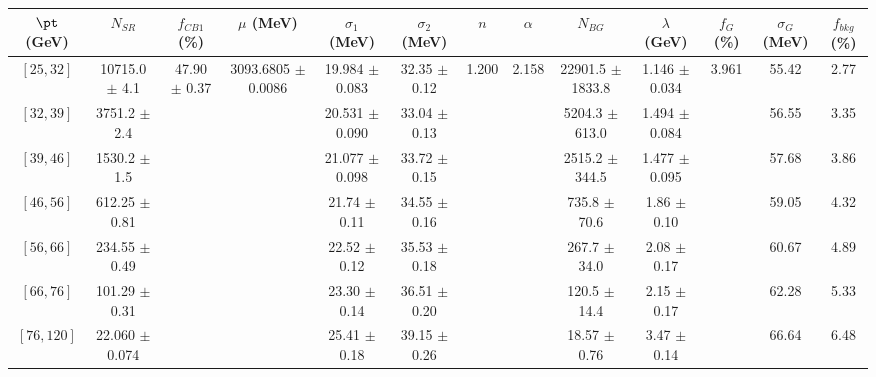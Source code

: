 \begin{tabular}{c||c|c|c|c|c|c|c|c|c|c|c||c}
$\pt$ (GeV) & $N_{SR}$ & $f_{CB1}$ (\%) & $\mu$ (MeV) & $\sigma_1$ (MeV) & $\sigma_2$ (MeV) & $n$ & $\alpha$ & $N_{BG}$ & $\lambda$ (GeV) & $f_G$ (\%) & $\sigma_G$ (MeV) & $f_{bkg}$ (\%) \\
\hline
$[25, 32]$ & 10715.0 $\pm$ 4.1 & \multirow{7}{*}{47.90 $\pm$ 0.37} & \multirow{7}{*}{3093.6805 $\pm$ 0.0086} & 19.984 $\pm$ 0.083 & 32.35 $\pm$ 0.12 & \multirow{7}{*}{1.200} & \multirow{7}{*}{2.158} & 22901.5 $\pm$ 1833.8 & 1.146 $\pm$ 0.034 & \multirow{7}{*}{3.961} & 55.42 & 2.77\\
$[32, 39]$ & 3751.2 $\pm$ 2.4 &  &  & 20.531 $\pm$ 0.090 & 33.04 $\pm$ 0.13 &  &  & 5204.3 $\pm$ 613.0 & 1.494 $\pm$ 0.084 &  & 56.55 & 3.35\\
$[39, 46]$ & 1530.2 $\pm$ 1.5 &  &  & 21.077 $\pm$ 0.098 & 33.72 $\pm$ 0.15 &  &  & 2515.2 $\pm$ 344.5 & 1.477 $\pm$ 0.095 &  & 57.68 & 3.86\\
$[46, 56]$ & 612.25 $\pm$ 0.81 &  &  & 21.74 $\pm$ 0.11 & 34.55 $\pm$ 0.16 &  &  & 735.8 $\pm$ 70.6 & 1.86 $\pm$ 0.10 &  & 59.05 & 4.32\\
$[56, 66]$ & 234.55 $\pm$ 0.49 &  &  & 22.52 $\pm$ 0.12 & 35.53 $\pm$ 0.18 &  &  & 267.7 $\pm$ 34.0 & 2.08 $\pm$ 0.17 &  & 60.67 & 4.89\\
$[66, 76]$ & 101.29 $\pm$ 0.31 &  &  & 23.30 $\pm$ 0.14 & 36.51 $\pm$ 0.20 &  &  & 120.5 $\pm$ 14.4 & 2.15 $\pm$ 0.17 &  & 62.28 & 5.33\\
$[76, 120]$ & 22.060 $\pm$ 0.074 &  &  & 25.41 $\pm$ 0.18 & 39.15 $\pm$ 0.26 &  &  & 18.57 $\pm$ 0.76 & 3.47 $\pm$ 0.14 &  & 66.64 & 6.48\\
\end{tabular}

